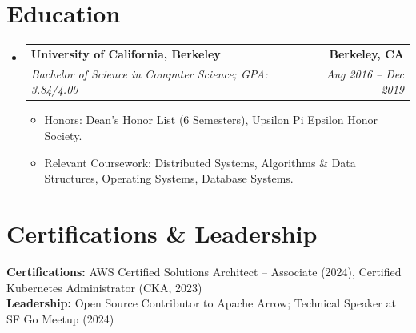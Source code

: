 \documentclass[letterpaper,10pt]{article}
\makeatletter
\newcommand{\resumeItem}[1]{
  \item\small{
    {#1 \vspace{-1.5pt}}
  }
}
\newcommand{\resumeSubheading}[4]{
  \vspace{-1pt}\item
    \begin{tabular*}{\textwidth}[t]{l@{\extracolsep{\fill}}r}
      \textbf{#1} & \textbf{\small\color{subtext}#2} \\
      \textit{\small#3} & \textit{\small\color{subtext}#4} \\
    \end{tabular*}\vspace{-5pt}
}
\newcommand{\resumeSubHeadingListStart}{\begin{itemize}[leftmargin=0.0in, label={}]}
\newcommand{\resumeSubHeadingListEnd}{\end{itemize}}
\newcommand{\resumeItemListStart}{\begin{itemize}[leftmargin=0.18in, itemsep=2pt, parsep=0pt, topsep=2pt]}
\newcommand{\resumeItemListEnd}{\end{itemize}\vspace{-3pt}}
\makeatother
\begin{document}
\section{Education}
  \resumeSubHeadingListStart
    \resumeSubheading
      {University of California, Berkeley}{Berkeley, CA}
      {Bachelor of Science in Computer Science; GPA: 3.84/4.00}{Aug 2016 -- Dec 2019}
      \resumeItemListStart
        \resumeItem{Honors: Dean's Honor List (6 Semesters), Upsilon Pi Epsilon Honor Society.}
        \resumeItem{Relevant Coursework: Distributed Systems, Algorithms \& Data Structures, Operating Systems, Database Systems.}
      \resumeItemListEnd
  \resumeSubHeadingListEnd

\section{Certifications \& Leadership}
 \begin{itemize}[leftmargin=0.0in, label={}]
    \small{\item{
     \textbf{Certifications:}{ AWS Certified Solutions Architect -- Associate (2024), Certified Kubernetes Administrator (CKA, 2023)} \\
     \textbf{Leadership:}{ Open Source Contributor to Apache Arrow; Technical Speaker at SF Go Meetup (2024)}
    }}
 \end{itemize}
\end{document}
